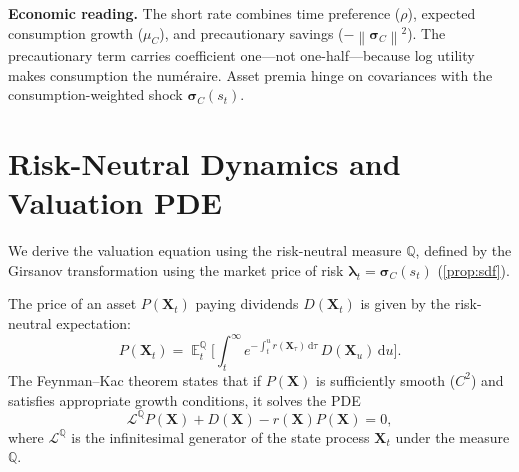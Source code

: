 ﻿\documentclass[11pt,letterpaper,oneside]{article}
\numberwithin{equation}{section}
\DeclareMathOperator{\E}{\mathbb{E}}
\newcommand{\1}{\mathbf{1}}
\newcommand{\diff}{\mathrm{d}}
\newcommand{\norm}[1]{\left\lVert #1\right\rVert}
\begin{document}
\begin{tcolorbox}[didacticstyle]
  	\textbf{Economic reading.} The short rate combines time preference ($\rho$), expected consumption growth ($\mu_C$), and precautionary savings ($-\norm{\bm{\sigma}_C}^2$). The precautionary term carries coefficient one---not one-half---because log utility makes consumption the num\'eraire. Asset premia hinge on covariances with the consumption-weighted shock $\bm{\sigma}_C(s_t)$.
\end{tcolorbox}

\section{Risk-Neutral Dynamics and Valuation PDE}\label{sec:pde}

We derive the valuation equation using the risk-neutral measure $\mathbb{Q}$, defined by the Girsanov transformation using the market price of risk $\bm{\lambda}_t=\bm{\sigma}_C(s_t)$ (\cref{prop:sdf}).

\begin{tcolorbox}[mathstyle, title={Feynman--Kac Theorem and Valuation}]
The price of an asset $P(\bm{X}_t)$ paying dividends $D(\bm{X}_t)$ is given by the risk-neutral expectation:
\[
  P(\bm{X}_t) = \E^{\mathbb{Q}}_t\Big[\int_t^\infty e^{-\int_t^u r(\bm{X}_\tau)\,\diff\tau} \, D(\bm{X}_u)\,\diff u\Big].
\]
The Feynman--Kac theorem states that if $P(\bm{X})$ is sufficiently smooth ($C^2$) and satisfies appropriate growth conditions, it solves the PDE
\[
  \mathcal{L}^{\mathbb{Q}} P(\bm{X}) + D(\bm{X}) - r(\bm{X}) P(\bm{X}) = 0,
\]
where $\mathcal{L}^{\mathbb{Q}}$ is the infinitesimal generator of the state process $\bm{X}_t$ under the measure $\mathbb{Q}$.
\end{tcolorbox}
\end{document}
